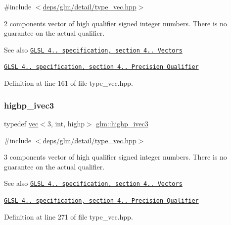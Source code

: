{\ttfamily \#include $<$\hyperlink{type__vec_8hpp}{deps/glm/detail/type\+\_\+vec.\+hpp}$>$}

2 components vector of high qualifier signed integer numbers. There is no guarantee on the actual qualifier.

\begin{DoxySeeAlso}{See also}
\href{http://www.opengl.org/registry/doc/GLSLangSpec.4.20.8.pdf}{\tt G\+L\+SL 4.. specification, section 4.. Vectors} 

\href{http://www.opengl.org/registry/doc/GLSLangSpec.4.20.8.pdf}{\tt G\+L\+SL 4.. specification, section 4.. Precision Qualifier} 
\end{DoxySeeAlso}


Definition at line 161 of file type\+\_\+vec.\+hpp.

\mbox{\label{group__core__precision_ga52ba3edf3183078cf4129e6193b32a2c}} 
\subsubsection{\texorpdfstring{highp\+\_\+ivec3}{highp\_ivec3}}
{\footnotesize\ttfamily typedef \hyperlink{structglm_1_1vec}{vec}$<$3, int, highp$>$ \hyperlink{group__core__precision_ga52ba3edf3183078cf4129e6193b32a2c}{glm\+::highp\+\_\+ivec3}}



{\ttfamily \#include $<$\hyperlink{type__vec_8hpp}{deps/glm/detail/type\+\_\+vec.\+hpp}$>$}

3 components vector of high qualifier signed integer numbers. There is no guarantee on the actual qualifier.

\begin{DoxySeeAlso}{See also}
\href{http://www.opengl.org/registry/doc/GLSLangSpec.4.20.8.pdf}{\tt G\+L\+SL 4.. specification, section 4.. Vectors} 

\href{http://www.opengl.org/registry/doc/GLSLangSpec.4.20.8.pdf}{\tt G\+L\+SL 4.. specification, section 4.. Precision Qualifier} 
\end{DoxySeeAlso}


Definition at line 271 of file type\+\_\+vec.\+hpp.

\mbox{\label{group__core__precision_gaff761e336e3b52f04e725fa85c6d36d1}} 
